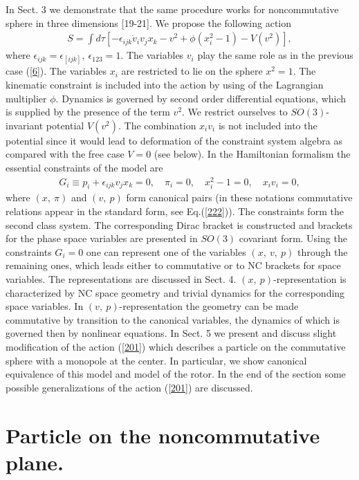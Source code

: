 \documentclass[paper a4]{article}
\begin{document}
In Sect. 3 we demonstrate that the same procedure works for
noncommutative sphere in three dimensions [19-21]. We propose the
following action
\begin{eqnarray}\label{201}
S=\int d\tau\left[-\epsilon_{ijk}\dot v_iv_jx_k-
v^2+\phi(x_i^2-1)-V(v^2)\right],
\end{eqnarray}
where $\epsilon_{ijk}=\epsilon_{[ijk]}, ~ \epsilon_{123}=1$. The variables
$v_i$ play the same role as in the previous case (\ref{6}). The variables
$x_i$ are restricted to lie on the sphere $x^2=1$. The kinematic constraint
is included into the action by using of the Lagrangian multiplier $\phi$.
Dynamics is governed by second order differential equations,
which is supplied by the presence of the term $v^2$.
We restrict ourselves to
$SO(3)$-invariant potential $V(v^2)$. The combination $x_iv_i$ is not
included into the potential since it would lead to deformation of the
constraint system algebra as compared with the free case $V=0$
(see below).
In the Hamiltonian formalism
the essential constraints of the model are
\begin{eqnarray}\label{102}
G_i\equiv p_i+\epsilon_{ijk}v_jx_k=0, \quad
\pi_i=0, \quad
x_i^2-1=0, \quad x_iv_i=0,
\end{eqnarray}
where $(x, ~ \pi)$ and $(v, ~ p)$ form canonical pairs (in these notations
commutative relations appear in the standard form, see Eq.(\ref{222})).
The constraints form the second class system.
The corresponding Dirac bracket is constructed
and brackets for the phase space variables are presented in $SO(3)$
covariant form. Using the constraints $G_i=0$ one can represent one of the
variables $(x, ~ v, ~ p)$ through the remaining ones,
which leads either to commutative or to NC brackets for space variables.
The representations are discussed in Sect. 4.
$(x, ~ p)$-representation is characterized by NC space geometry and
trivial dynamics for the corresponding space variables. In
$(v, ~ p)$-representation the geometry can be made commutative by
transition to the canonical variables,
the dynamics of which is governed then by
nonlinear equations. In Sect. 5 we present and discuss slight
modification of the action (\ref{201}) which describes a particle on the
commutative sphere with a monopole at the center. In particular, we
show canonical equivalence of this model and model of the rotor.
In the end of the section some possible generalizations of the
action (\ref{201}) are discussed.

\section{Particle on the noncommutative plane.}
\end{document}
